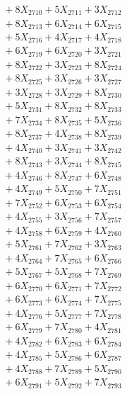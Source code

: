 \documentclass[a4paper,10pt]{article}
\begin{document}
{\begin{align}
&\;  + 8 X_{2710} + 5 X_{2711} + 3 X_{2712} \\[0.3ex]
&\;  + 8 X_{2713} + 6 X_{2714} + 6 X_{2715} \\[0.3ex]
&\;  + 5 X_{2716} + 4 X_{2717} + 4 X_{2718} \\[0.3ex]
&\;  + 6 X_{2719} + 6 X_{2720} + 3 X_{2721} \\[0.3ex]
&\;  + 8 X_{2722} + 3 X_{2723} + 8 X_{2724} \\[0.3ex]
&\;  + 8 X_{2725} + 3 X_{2726} + 3 X_{2727} \\[0.3ex]
&\;  + 3 X_{2728} + 3 X_{2729} + 8 X_{2730} \\[0.3ex]
&\;  + 5 X_{2731} + 8 X_{2732} + 8 X_{2733} \\[0.3ex]
&\;  + 7 X_{2734} + 8 X_{2735} + 5 X_{2736} \\[0.3ex]
&\;  + 8 X_{2737} + 4 X_{2738} + 8 X_{2739} \\[0.5ex]\allowbreak
&\;  + 4 X_{2740} + 3 X_{2741} + 3 X_{2742} \\[0.3ex]
&\;  + 8 X_{2743} + 3 X_{2744} + 8 X_{2745} \\[0.3ex]
&\;  + 4 X_{2746} + 8 X_{2747} + 6 X_{2748} \\[0.3ex]
&\;  + 4 X_{2749} + 5 X_{2750} + 7 X_{2751} \\[0.3ex]
&\;  + 7 X_{2752} + 6 X_{2753} + 6 X_{2754} \\[0.3ex]
&\;  + 4 X_{2755} + 3 X_{2756} + 7 X_{2757} \\[0.3ex]
&\;  + 4 X_{2758} + 6 X_{2759} + 4 X_{2760} \\[0.3ex]
&\;  + 5 X_{2761} + 7 X_{2762} + 3 X_{2763} \\[0.3ex]
&\;  + 4 X_{2764} + 7 X_{2765} + 6 X_{2766} \\[0.3ex]
&\;  + 5 X_{2767} + 5 X_{2768} + 7 X_{2769} \\[0.5ex]\allowbreak
&\;  + 6 X_{2770} + 6 X_{2771} + 7 X_{2772} \\[0.3ex]
&\;  + 6 X_{2773} + 6 X_{2774} + 7 X_{2775} \\[0.3ex]
&\;  + 4 X_{2776} + 5 X_{2777} + 7 X_{2778} \\[0.3ex]
&\;  + 6 X_{2779} + 7 X_{2780} + 4 X_{2781} \\[0.3ex]
&\;  + 4 X_{2782} + 6 X_{2783} + 6 X_{2784} \\[0.3ex]
&\;  + 4 X_{2785} + 5 X_{2786} + 6 X_{2787} \\[0.3ex]
&\;  + 4 X_{2788} + 7 X_{2789} + 5 X_{2790} \\[0.3ex]
&\;  + 6 X_{2791} + 5 X_{2792} + 7 X_{2793} \\[0.3ex]

\end{align}}
\end{document}
